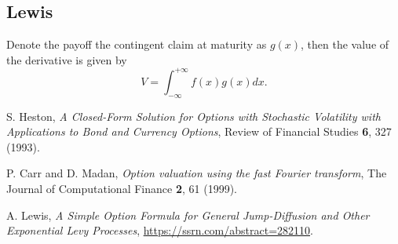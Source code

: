 \documentclass[12pt]{article}
\begin{document}
  \subsection{Lewis \cite{Lewis}}

    Denote the payoff the contingent claim at maturity as $g(x)$, then the value of the derivative is given by
    \begin{equation}
      V = \int_{-\infty}^{+\infty}f(x)g(x)dx.
    \end{equation}


\begin{thebibliography}{99}
    S. Heston, {\it A Closed-Form Solution for Options with Stochastic Volatility with Applications to Bond and Currency Options}, Review of Financial Studies {\bf 6}, 327 (1993).

    P. Carr and D. Madan, {\it Option valuation using the fast Fourier transform}, The Journal of Computational Finance {\bf 2}, 61 (1999).

    A. Lewis, {\it A Simple Option Formula for General Jump-Diffusion and Other Exponential Levy Processes}, \url{https://ssrn.com/abstract=282110}.

\end{thebibliography}
\end{document}
